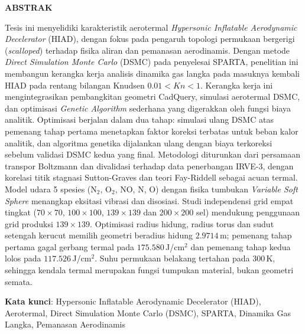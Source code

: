 \clearpage
{}
{}
\begin{center}
\textbf{\large  ABSTRAK}\\[0.5cm]
\end{center}

Tesis ini menyelidiki karakteristik aerotermal \emph{Hypersonic Inflatable Aerodynamic Decelerator} (HIAD), dengan fokus pada pengaruh topologi permukaan bergerigi (\emph{scalloped}) terhadap fisika aliran dan pemanasan aerodinamis. Dengan metode \emph{Direct Simulation Monte Carlo} (DSMC) pada penyelesai SPARTA, penelitian ini membangun kerangka kerja analisis dinamika gas langka pada masuknya kembali HIAD pada rentang bilangan Knudsen $0.01 < Kn < 1$. Kerangka kerja ini mengintegrasikan pembangkitan geometri CadQuery, simulasi aerotermal DSMC, dan optimisasi \emph{Genetic Algorithm} sederhana yang digerakkan oleh fungsi biaya analitik. Optimisasi berjalan dalam dua tahap: simulasi ulang DSMC atas pemenang tahap pertama menetapkan faktor koreksi terbatas untuk beban kalor analitik, dan algoritma genetika dijalankan ulang dengan biaya terkoreksi sebelum validasi DSMC kedua yang final. Metodologi diturunkan dari persamaan transpor Boltzmann dan divalidasi terhadap data penerbangan IRVE-3, dengan korelasi titik stagnasi Sutton-Graves dan teori Fay-Riddell sebagai acuan termal. Model udara 5 spesies (N$_2$, O$_2$, NO, N, O) dengan fisika tumbukan \emph{Variable Soft Sphere} menangkap eksitasi vibrasi dan disosiasi. Studi independensi grid empat tingkat ($70\times70$, $100\times100$, $139\times139$ dan $200\times200$ sel) mendukung penggunaan grid produksi $139\times139$. Optimisasi radius hidung, radius torus dan sudut setengah kerucut memilih geometri beradius hidung $2.9714$\,m; pemenang tahap pertama gagal gerbang termal pada $175.580$\,J/cm$^2$ dan pemenang tahap kedua lolos pada $117.526$\,J/cm$^2$. Suhu permukaan belakang tertahan pada $300$\,K, sehingga kendala termal merupakan fungsi tumpukan material, bukan geometri semata.

\noindent \textbf{Kata kunci}: Hypersonic Inflatable Aerodynamic Decelerator (HIAD), Aerotermal, Direct Simulation Monte Carlo (DSMC), SPARTA, Dinamika Gas Langka, Pemanasan Aerodinamis  %
